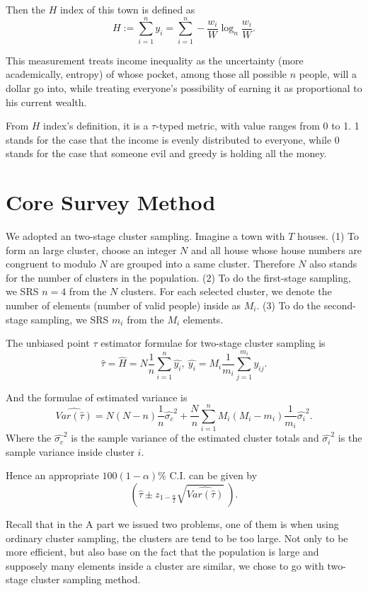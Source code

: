 \documentclass[12pt]{article}%
\begin{document}
Then the $H$ index of this town is defined as 
$$H:=\sum_{i=1}^{n}y_i= \sum_{i=1}^n -\frac{w_i}{W}\log_{n}{\frac{w_i}{W}}.$$

This measurement treats income inequality as the uncertainty 
(more academically, entropy) of 
whose pocket, among those all possible $n$ people, will a dollar go into, 
while treating everyone's possibility of earning it as 
proportional to his current wealth.

From $H$ index's definition, it is a $\tau$-typed metric, 
with value ranges from 0 to 1. 
1 stands for the case that the income is evenly distributed to everyone,
while 0 stands for the case that 
someone evil and greedy is holding all the money.

\section{Core Survey Method}
We adopted an two-stage cluster sampling. 
Imagine a town with $T$ houses. 
(1) To form an large cluster, choose an integer $N$ 
and all house whose house numbers are congruent to modulo $N$
are grouped into a same cluster. 
Therefore $N$ also stands for the number of clusters in the population. 
(2) To do the first-stage sampling, we SRS $n=4$ from the $N$ clusters. 
For each selected cluster,
we denote the number of elements (number of valid people) inside as $M_i$.
(3) To do the second-stage sampling, we SRS $m_i$ from the $M_i$ elements.

The unbiased point $\tau$ estimator formulae for two-stage cluster sampling is 
$$\hat{\tau}=\hat{H}=N\frac{1}{n} \sum_{i=1}^n \hat{y_i},~
\hat{y_i}=M_i\frac{1}{m_i} \sum_{j=1}^{m_i}y_{ij}.$$

And the formulae of estimated variance is 
$$\widehat{Var(\hat{\tau})} = 
N(N-n)\frac{1}{n}\hat{\sigma_c}^2
+\frac{N}{n}\sum_{i=1}^{n}M_i(M_i-m_i)\frac{1}{m_i}\hat{\sigma_i}^2.$$ 
Where the $\hat{\sigma_c}^2$ is the sample variance of the estimated cluster
totals and $\hat{\sigma_i}^2$ is the sample variance inside cluster $i$.

Hence an appropriate $100(1-\alpha)\% $ C.I. can be given by 
$$(\hat{\tau} \pm z_{1-\frac{\alpha}{2}} \sqrt{\widehat{Var(\hat{\tau})}}~).$$

Recall that in the A part we issued two problems, 
one of them is when using ordinary cluster sampling, 
the clusters are tend to be too large. 
Not only to be more efficient, but also
base on the fact that the population is large and supposely many elements
inside a cluster are similar, 
we chose to go with two-stage cluster sampling method.
\end{document}
